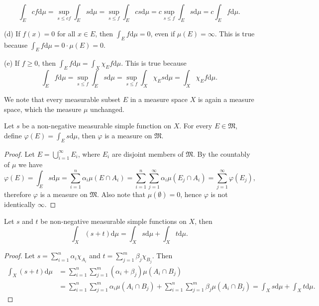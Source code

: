 $$
\int_E{cf\mathrm{d}\mu}=\mathop {\mathrm{sup}} \limits_{s\le cf}\int_E{s\mathrm{d}\mu}=\mathop {\mathrm{sup}} \limits_{s\le f}\int_E{cs\mathrm{d}\mu}=c\mathop {\mathrm{sup}} \limits_{s\le f}\int_E{s\mathrm{d}\mu}=c\int_E{f\mathrm{d}\mu}.
$$\par
(d) If $f(x)=0$ for all $x\in E$, then $\int_Ef\mathrm{d}\mu=0$, even if $\mu(E)=\infty$. This is true because $\int_Ef\mathrm{d}\mu=0\cdot\mu(E)=0$.\par
(e) If $f\ge 0$, then $\int_Ef\mathrm{d}\mu=\int_X\chi_Ef\mathrm{d}\mu$. This is true because 
$$
\int_E{f\mathrm{d}\mu}=\mathop {\mathrm{sup}} \limits_{s\le f}\int_E{s\mathrm{d}\mu}=\mathop {\mathrm{sup}} \limits_{s\le f}\int_X{\chi _Es\mathrm{d}\mu}=\int_X{\chi _Ef\mathrm{d}\mu}.
$$\par
We note that every measurable subset $E$ in a measure space $X$ is again a measure space, which the measure $\mu$ unchanged.
\begin{proposition}
Let $s$ be a non-negative measurable simple function on $X$. For every $E\in\mathfrak{M}$, define $\varphi(E)=\int_Es\mathrm{d}\mu$, then $\varphi$ is a measure on $\mathfrak{M}$.
\end{proposition}
\begin{proof}
Let $E=\bigcup_{i=1}^\infty E_i$, where $E_i$ are disjoint members of $\mathfrak{M}$. By the countably of $\mu$ we have 
$$
\varphi \left( E \right) =\int_E{s\mathrm{d}\mu}=\sum_{i=1}^n{\alpha _i\mu \left( E\cap A_i \right)}=\sum_{i=1}^n{\sum_{j=1}^{\infty}{\alpha _i\mu \left( E_j\cap A_i \right)}}=\sum_{j=1}^{\infty}{\varphi \left( E_j \right)},
$$
therefore $\varphi$ is a measure on $\mathfrak{M}$. Also note that $\mu(\emptyset)=0$, hence $\varphi$ is not identically $\infty$.
\end{proof}
\begin{proposition}
Let $s$ and $t$ be non-negative measurable simple functions on $X$, then 
$$\int_X(s+t)\mathrm{d}\mu=\int_Xs\mathrm{d}\mu+\int_Xt\mathrm{d}\mu.$$
\end{proposition}
\begin{proof}
Let $s=\sum_{i=1}^n\alpha_i\chi_{A_i}$ and $t=\sum_{j=1}^m\beta_j\chi_{B_j}$. Then 
$$
\begin{aligned}
\int_X{\left( s+t \right) \mathrm{d}\mu}&=\sum_{i=1}^n{\sum_{j=1}^m{\left( \alpha _i+\beta _j \right) \mu \left( A_i\cap B_j \right)}}
\\
&=\sum_{i=1}^n{\sum_{j=1}^m{\alpha _i\mu \left( A_i\cap B_j \right)}}+\sum_{i=1}^n{\sum_{j=1}^m{\beta _j\mu \left( A_i\cap B_j \right)}}=\int_X{s\mathrm{d}\mu}+\int_X{t\mathrm{d}\mu}.    
\end{aligned}
$$
\end{proof}
